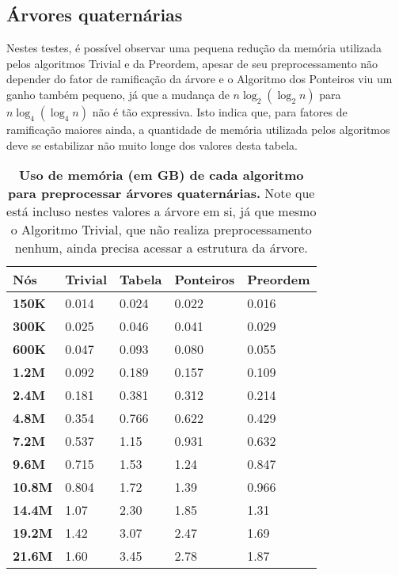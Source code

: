 \subsection{Árvores quaternárias}
Nestes testes, é possível observar uma pequena redução da memória utilizada pelos
algoritmos Trivial e da Preordem, apesar de seu preprocessamento não depender do fator
de ramificação da árvore e o Algoritmo dos Ponteiros viu um ganho também pequeno, já
que a mudança de $n \log_2(\log_2 n)$ para $n \log_4(\log_4 n)$ não é tão expressiva.
Isto indica que, para fatores de ramificação maiores ainda, a quantidade de memória
utilizada pelos algoritmos deve se estabilizar não muito longe dos valores desta tabela.

\begin{table}[H]
  \begin{tabular}{|l|l|l|l|l|}
  \hline
  \textbf{Nós}   & \textbf{Trivial} & \textbf{Tabela} & \textbf{Ponteiros} & \textbf{Preordem} \\ \hline
  \textbf{150K}  & 0.014            & 0.024             & 0.022              & 0.016             \\ \hline
  \textbf{300K}  & 0.025            & 0.046             & 0.041              & 0.029             \\ \hline
  \textbf{600K}  & 0.047            & 0.093             & 0.080              & 0.055             \\ \hline
  \textbf{1.2M}  & 0.092            & 0.189             & 0.157              & 0.109             \\ \hline
  \textbf{2.4M}  & 0.181            & 0.381             & 0.312              & 0.214             \\ \hline
  \textbf{4.8M}  & 0.354            & 0.766             & 0.622              & 0.429             \\ \hline
  \textbf{7.2M}  & 0.537            & 1.15              & 0.931              & 0.632             \\ \hline
  \textbf{9.6M}  & 0.715            & 1.53              & 1.24               & 0.847             \\ \hline
  \textbf{10.8M} & 0.804            & 1.72              & 1.39               & 0.966             \\ \hline
  \textbf{14.4M} & 1.07             & 2.30              & 1.85               & 1.31              \\ \hline
  \textbf{19.2M} & 1.42             & 3.07              & 2.47               & 1.69              \\ \hline
  \textbf{21.6M} & 1.60             & 3.45              & 2.78               & 1.87              \\ \hline
  \end{tabular}
  \caption[Uso de memória (em GB) de cada algoritmo para preprocessar árvores quaternárias.]
  {\textbf{Uso de memória (em GB) de cada algoritmo para preprocessar árvores quaternárias.}
   Note que está incluso nestes valores a árvore em si, já que mesmo o Algoritmo Trivial,
   que não realiza preprocessamento nenhum, ainda precisa acessar a estrutura da árvore.}
  \end{table}

